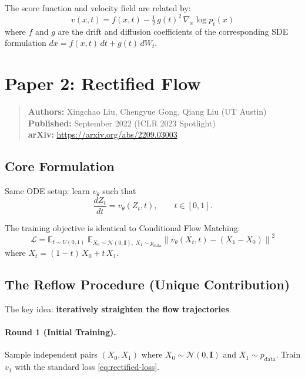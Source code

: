\documentclass[11pt, a4paper]{article}
\newcommand{\vtheta}{v_\theta}
\newcommand{\E}{\mathbb{E}}
\newcommand{\N}{\mathcal{N}}
\newcommand{\Id}{\mathbf{I}}
\newcommand{\norm}[1]{\left\lVert #1 \right\rVert}
\begin{document}
The score function and velocity field are related by:
\begin{equation}
  \label{eq:score-velocity}
  v(x, t) = f(x, t) - \tfrac{1}{2}\, g(t)^2 \,\nabla_x \log p_t(x)
\end{equation}
where $f$ and $g$ are the drift and diffusion coefficients of the corresponding
SDE formulation $dx = f(x,t)\,dt + g(t)\,dW_t$.

\section{Paper 2: Rectified Flow}
\label{sec:paper2}

\begin{quote}
\textbf{Authors:} Xingchao Liu, Chengyue Gong, Qiang Liu (UT Austin) \\
\textbf{Published:} September 2022 (ICLR 2023 Spotlight) \\
\textbf{arXiv:} \url{https://arxiv.org/abs/2209.03003}
\end{quote}

\subsection{Core Formulation}

Same ODE setup: learn $\vtheta$ such that
\begin{equation}
  \frac{dZ_t}{dt} = \vtheta(Z_t, t), \qquad t \in [0, 1].
\end{equation}

The training objective is identical to Conditional Flow Matching:
\begin{equation}
  \label{eq:rectified-loss}
  \mathcal{L}
  = \E_{t \sim U(0,1)}\;
    \E_{X_0 \sim \N(0,\Id),\; X_1 \sim p_{\mathrm{data}}}
    \norm{\vtheta(X_t, t) - (X_1 - X_0)}^2
\end{equation}
where $X_t = (1 - t)\, X_0 + t\, X_1$.

\subsection{The Reflow Procedure (Unique Contribution)}

The key idea: \textbf{iteratively straighten the flow trajectories}.

\paragraph{Round 1 (Initial Training).}
Sample independent pairs $(X_0, X_1)$ where $X_0 \sim \N(0,\Id)$ and
$X_1 \sim p_{\mathrm{data}}$.  Train $v_1$ with the standard loss
\eqref{eq:rectified-loss}.
\end{document}
